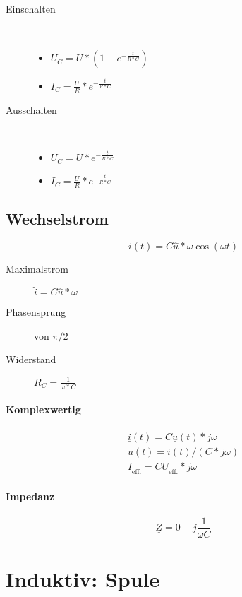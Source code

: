 \begin{description}
  \item[Einschalten]\
  \begin{itemize}
    \item $U_C = U * (1 - e^{- \frac{t}{R * C}})$
    \item $I_C = \frac{U}{R} * e^{- \frac{t}{R * C}}$
  \end{itemize}

  \item[Ausschalten]\
  \begin{itemize}
    \item $U_C = U * e^{- \frac{t}{R * C}}$
    \item $I_C = \frac{U}{R} * e^{- \frac{t}{R * C}}$
  \end{itemize}
\end{description}

\subsection{Wechselstrom}

$$i(t) = C \hat{u} * \omega \cos (\omega t)$$

\begin{description}
  \item[Maximalstrom] $\hat{i} = C \hat{u} * \omega$
  \item[Phasensprung] von $\pi/2$
  \item[Widerstand] $R_C = \frac{1}{\omega * C}$
\end{description}

\paragraph{Komplexwertig}

\begin{gather*}
  \underline{i}(t) = C \underline{u}(t) * j\omega \\
  \underline{u}(t) = \underline{i}(t) / (C * j\omega) \\
  \underline{I}_\text{eff.} = C \underline{U}_\text{eff.} * j\omega
\end{gather*}

\paragraph{Impedanz}

$$\underline{Z} = 0 -j \frac{1}{\omega C}$$

\section{Induktiv: Spule}

